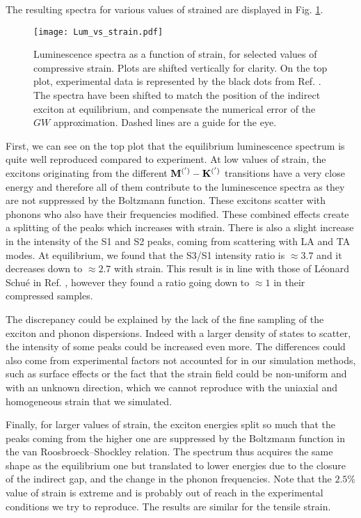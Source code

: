 The resulting spectra for various values of strained are displayed in Fig. \ref{fig:Lum_vs_strain}.
\begin{figure}[h!tb]
	\vspace{0.2cm}
	\setcapindent{2em}
	\centering
	\texttt{[image: Lum\_vs\_strain.pdf]}
	\caption{Luminescence spectra as a function of strain, for selected values of compressive strain. Plots are shifted vertically for clarity. On the top plot, experimental data is represented by the black dots from Ref. \cite{schue2019bright}. The spectra have been shifted to match the position of the indirect exciton at equilibrium, and compensate the numerical error of the $GW$ approximation.\cite{artus2021ellipsometry} Dashed lines are a guide for the eye.}
	\label{fig:Lum_vs_strain}
\end{figure}
First, we can see on the top plot that the equilibrium luminescence spectrum is quite well reproduced compared to experiment. At low values of strain, the excitons originating from the different $\bf{ M^{(')}} - \bf{ K^{(')}}$ transitions have a very close energy and therefore all of them contribute to the luminescence spectra as they are not suppressed by the Boltzmann function. These excitons scatter with phonons who also have their frequencies modified. These combined effects create a splitting of the peaks which increases with strain. There is also a slight increase in the intensity of the S1 and S2 peaks, coming from scattering with LA and TA modes. At equilibrium, we found that the S3/S1 intensity ratio is $\approx 3.7$ and it decreases down to $\approx 2.7$ with strain. This result is in line with those of Léonard Schué in Ref. \cite{schue2017proprietes}, however they found a ratio going down to $\approx 1$ in their compressed samples.

The discrepancy could be explained by the lack of the fine sampling of the exciton and phonon dispersions. Indeed with a larger density of states to scatter, the intensity of some peaks could be increased even more. The differences could also come from experimental factors not accounted for in our simulation methods, such as surface effects or the fact that the strain field could be non-uniform and with an unknown direction, which we cannot reproduce with the uniaxial and homogeneous strain that we simulated.  

Finally, for larger values of strain, the exciton energies split so much that the peaks coming from the higher one are suppressed by the Boltzmann function in the van Roosbroeck--Shockley relation. The spectrum thus acquires the same shape as the equilibrium one but translated to lower energies due to the closure of the indirect gap, and the change in the phonon frequencies. Note that the $2.5\%$ value of strain is extreme and is probably out of reach in the experimental conditions we try to reproduce. The results are similar for the tensile strain.

